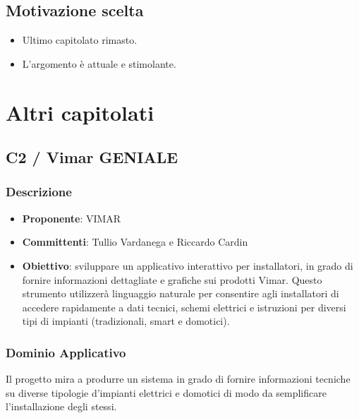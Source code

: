 \documentclass[a4paper, 12pt]{article}
\begin{document}
\subsection{Motivazione scelta}
\begin{itemize}
    \item Ultimo capitolato rimasto.
    \item L'argomento è attuale e stimolante.
\end{itemize}

\section{Altri capitolati}
\subsection{C2 / Vimar GENIALE}

\subsubsection{Descrizione}
\begin{itemize}
    \item \textbf{Proponente}: VIMAR
    \item \textbf{Committenti}: Tullio Vardanega e Riccardo Cardin
    \item \textbf{Obiettivo}: sviluppare un applicativo interattivo per installatori, in grado di fornire informazioni dettagliate e grafiche sui prodotti Vimar. 
    Questo strumento utilizzerà linguaggio naturale per consentire agli installatori di accedere rapidamente a dati tecnici, schemi elettrici e istruzioni per diversi tipi di impianti (tradizionali, smart e domotici).    
\end{itemize}

\subsubsection{Dominio Applicativo}
Il progetto mira a produrre un sistema in grado di fornire informazioni tecniche su diverse tipologie d'impianti elettrici e domotici di modo da semplificare l’installazione degli stessi.
\end{document}

